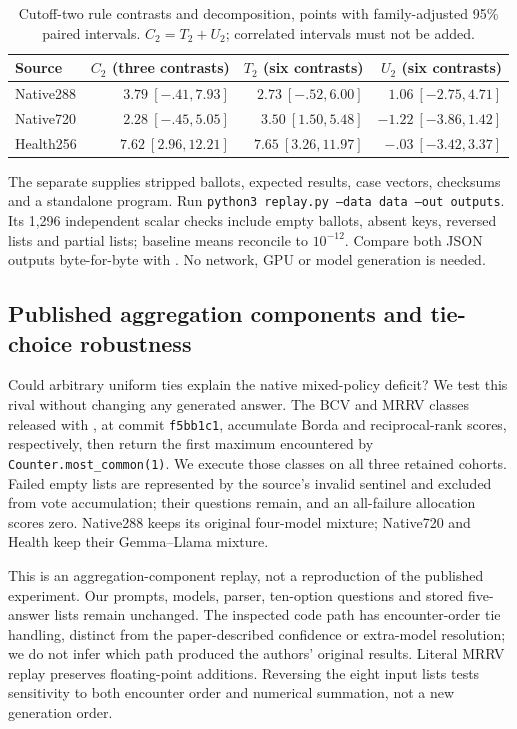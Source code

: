 \begin{table}[ht]
\centering\small
\caption{Cutoff-two rule contrasts and decomposition, points with family-adjusted 95\% paired intervals. $C_2=T_2+U_2$; correlated intervals must not be added.}
\label{tab:cutoff_contrasts}
\begin{tabular}{lrrr}
\toprule
Source & $C_2$ (three contrasts) & $T_2$ (six contrasts) & $U_2$ (six contrasts)\\
\midrule
Native288 & $3.79\ [-.41,7.93]$ & $2.73\ [-.52,6.00]$ & $1.06\ [-2.75,4.71]$\\
Native720 & $2.28\ [-.45,5.05]$ & $3.50\ [1.50,5.48]$ & $-1.22\ [-3.86,1.42]$\\
Health256 & $7.62\ [2.96,12.21]$ & $7.65\ [3.26,11.97]$ & $-.03\ [-3.42,3.37]$\\
\bottomrule
\end{tabular}
\end{table}

The separate  supplies stripped ballots, expected results, case vectors, checksums and a standalone program. Run \texttt{python3 replay.py --data data --out outputs}. Its 1,296 independent scalar checks include empty ballots, absent keys, reversed lists and partial lists; baseline means reconcile to $10^{-12}$. Compare both JSON outputs byte-for-byte with . No network, GPU or model generation is needed.

\subsection{Published aggregation components and tie-choice robustness}\label{app:public_ties}

Could arbitrary uniform ties explain the native mixed-policy deficit? We test this rival without changing any generated answer. The BCV and MRRV classes released with \citet{wang2025ranked}, at commit \texttt{f5bb1c1}, accumulate Borda and reciprocal-rank scores, respectively, then return the first maximum encountered by \texttt{Counter.most\_common(1)}. We execute those classes on all three retained cohorts. Failed empty lists are represented by the source's invalid sentinel and excluded from vote accumulation; their questions remain, and an all-failure allocation scores zero. Native288 keeps its original four-model mixture; Native720 and Health keep their Gemma--Llama mixture.

This is an aggregation-component replay, not a reproduction of the published experiment. Our prompts, models, parser, ten-option questions and stored five-answer lists remain unchanged. The inspected code path has encounter-order tie handling, distinct from the paper-described confidence or extra-model resolution; we do not infer which path produced the authors' original results. Literal MRRV replay preserves floating-point additions. Reversing the eight input lists tests sensitivity to both encounter order and numerical summation, not a new generation order.

